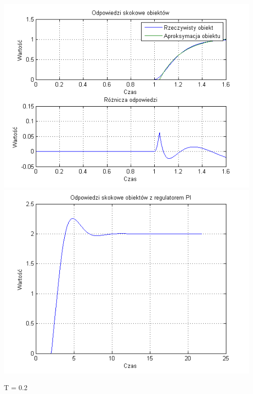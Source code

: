 \documentclass[10pt,a4paper]{article}
\begin{document}
\begin{center}
\includegraphics[scale=1]{images/jeden/skrypt_49.png}\\
\includegraphics[scale=1]{images/jeden/skrypt_50.png}\\
\end{center}
\newpage
T = 0.2
\end{document}
